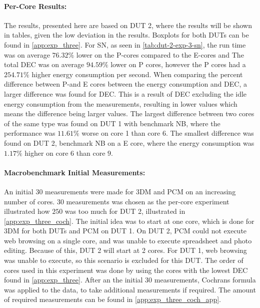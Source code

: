 \paragraph{Per-Core Results:} The results, presented here are based on DUT 2, where the results will be shown in tables, given the low deviation in the results. Boxplots for both DUTs can be found in \cref{app:exp_three}. For SN, as seen in \cref{tab:dut-2-exp-3-sn}, the run time was on average $76.32\%$ lower on the P-cores compared to the E-cores and The total DEC was on average $94.59\%$ lower on P cores, however the P cores had a $254.71\%$ higher energy consumption per second. When comparing the percent difference between P-and E cores between the energy consumption and DEC, a larger difference was found for DEC. This is a result of DEC excluding the idle energy consumption from the measurements, resulting in lower values which means the difference being larger values. %
The largest difference between two cores of the same type was found on DUT 1 with benchmark NB, where the performance was $11.61\%$ worse on core 1 than core 6. The smallest difference was found on DUT 2, benchmark NB on a E core, where the energy consumption was $1.17\%$ higher on core $6$ than core $9$.







\paragraph*{Macrobenchmark Initial Measurements:} An initial $30$ measurements were made for 3DM and PCM on an increasing number of cores. $30$ measurements was chosen as the per-core experiment illustrated how $250$ was too much for DUT 2, illustrated in \cref{app:exp_three_coch}. The initial idea was to start at one core, which is done for 3DM for both DUTs and PCM on DUT 1. On DUT 2, PCM could not execute web browsing on a single core, and was unable to execute spreadsheet and photo editing. Because of this, DUT 2 will start at 2 cores. For DUT 1, web browsing was unable to execute, so this scenario is excluded for this DUT. The order of cores used in this experiment was done by using the cores with the lowest DEC found in \cref{app:exp_three}. After an the initial $30$ measurements, Cochrans formula was applied to the data, to take additional measurements if required. The amount of required measurements can be found in \cref{app:exp_three_coch_app}.

